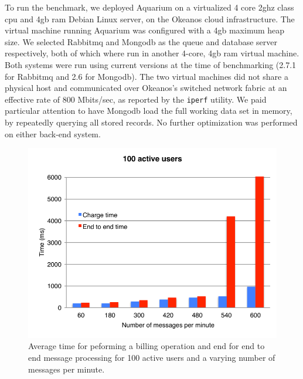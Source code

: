\documentclass[preprint,10pt]{sigplanconf}
\begin{document}
To run the benchmark, we deployed Aquarium on a virtualized 4 core 2{\sc gh}z
class {\sc cpu} and 4{\sc gb} {\sc ram} Debian Linux server, on the Okeanos
cloud infrastructure. The virtual machine running Aquarium was configured with
a 4{\sc gb} maximum heap size. We selected Rabbit{\sc mq} and Mongo{\sc db} as
the queue and database server respectively, both of which where run in another
4-core, 4{\sc gb ram} virtual machine. Both systems were run using current
versions at the time of benchmarking (2.7.1 for Rabbit{\sc mq} and 2.6 for
Mongo{\sc db}). The two virtual machines did not share a physical host and
communicated over Okeanos's switched network fabric at an effective rate of 800
Mbits/sec, as reported by the \texttt{iperf} utility.  We paid particular
attention to have Mongo{\sc db} load the full working data set in memory, by
repeatedly querying all stored records. No further optimization was performed
on either back-end system.

\begin{figure}[t]
    \begin{center}
        \includegraphics[scale=0.63]{perf.pdf}
    \end{center}

    \caption{Average time for peforming a billing operation and end for end to
    end message processing for 100 active users and a varying number of
    messages per minute.}
    
    \label{fig:perf}
\end{figure}
\end{document}
